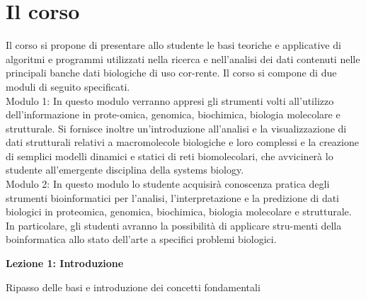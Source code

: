 \documentclass{article}
\begin{document}
\section{Il corso}
Il corso si propone di presentare allo studente le basi teoriche e applicative di algoritmi e programmi utilizzati nella ricerca e nell'analisi dei dati contenuti nelle principali banche dati biologiche di uso cor-rente. Il corso si compone di due moduli di seguito specificati.\\
Modulo 1: In questo modulo verranno appresi gli strumenti volti all'utilizzo dell'informazione in prote-omica, genomica, biochimica, biologia molecolare e strutturale. Si fornisce inoltre un'introduzione all'analisi e la visualizzazione di dati strutturali relativi a macromolecole biologiche e loro complessi e la creazione di semplici modelli dinamici e statici di reti biomolecolari, che avvicinerà lo studente all'emergente disciplina della systems biology.\\
Modulo 2: In questo modulo lo studente acquisirà conoscenza pratica degli strumenti bioinformatici per l'analisi, l'interpretazione e la predizione di dati biologici in proteomica, genomica, biochimica, biologia molecolare e strutturale. 
In particolare, gli studenti avranno la possibilità di applicare stru-menti della boinformatica allo stato dell'arte a specifici problemi biologici.
\begin{titlepage}
    \begin{center}
        \vspace*{1cm}
        \LARGE
        \textbf{Lezione 1: Introduzione}
            
        \vspace{1.5cm}
        
        \large
        Ripasso delle basi e introduzione dei concetti fondamentali

        \vspace{0.8cm}

    \end{center}
\end{titlepage}
\end{document}

